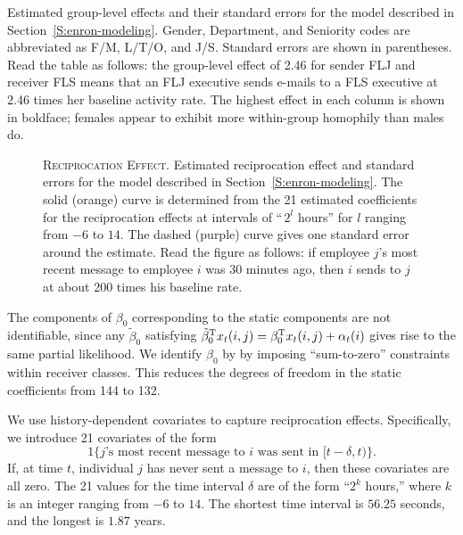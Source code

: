 \documentclass[aoas,preprint]{imsart}
\begin{document}
\begin{table}[h]
    \tiny
    
    \caption{
        Estimated group-level effects and their standard errors for the
        model described in Section~\ref{S:enron-modeling}.  Gender,
        Department, and Seniority codes are abbreviated as F/M, L/T/O,
        and J/S.  Standard errors are shown in parentheses.  Read
        the table as follows: the group-level effect of 2.46 for sender
        FLJ and receiver FLS means that an FLJ executive sends e-mails to a
        FLS executive at 2.46 times her baseline activity rate.  The highest
        effect in each column is shown in boldface; females appear to
        exhibit more within-group homophily than males do.
    }
    \label{T:group-effects}
\end{table}

\begin{figure}[h]
    \caption{
        \textsc{Reciprocation Effect.}
        Estimated reciprocation effect and standard errors for the
        model described in Section~\ref{S:enron-modeling}.  The solid
        (orange) curve is determined from the 21 estimated coefficients
        for the reciprocation effects at intervals of ``\,$2^l$ hours''
        for $l$ ranging from $-6$ to $14$.  The dashed (purple) curve gives
        one standard error around the estimate.  Read the figure as follows:
        if employee $j$'s most recent message to employee $i$ was 30 minutes
        ago, then $i$ sends to $j$ at about 200 times his baseline rate.
    }\label{F:reciprocation}
\end{figure}

The components of $\beta_0$ corresponding to the static components are not
identifiable, since any $\tilde \beta_0$ satisfying
$\tilde \beta_0^{\mathrm{T}} x_t(i,j) = \beta_0^{\mathrm{T}} x_t(i,j) + \alpha_t(i)$
gives rise to the same partial likelihood.  We identify $\beta_0$ by
by imposing ``sum-to-zero'' constraints within receiver classes.
This reduces the degrees of freedom in the static coefficients from 144 to
132.

We use history-dependent covariates to capture reciprocation effects.
Specifically, we introduce 21 covariates of the form
\[
    1\{\text{$j$'s most recent message to $i$ was sent in $[t-\delta, t)$\}}.
\]
If, at time $t$, individual $j$ has never sent a message to $i$, then
these covariates are all zero.  The 21 values for the time interval
$\delta$ are of the form ``$2^k$ hours,'' where $k$ is an integer ranging
from $-6$ to $14$.  The shortest time interval is $56.25$ seconds, and the
longest is $1.87$ years.
\end{document}
